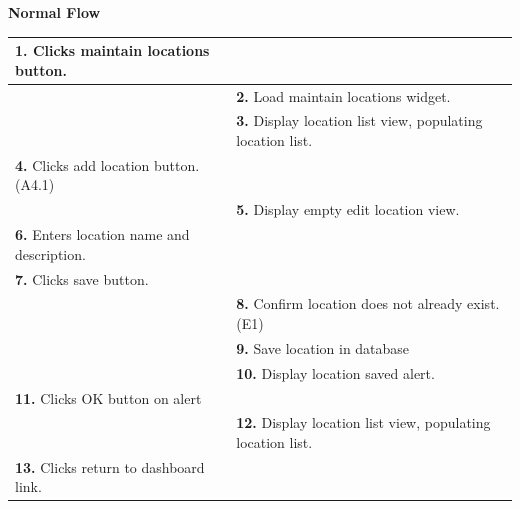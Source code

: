 \documentclass[letterpaper,12pt]{report}
\begin{document}
{ \centering \textbf{Normal Flow}
\begin{center}
\xuchead
\begin{tabular}{| p{8.5cm} | p{8.5cm} |}
\hline
\textbf{1.} Clicks maintain locations button. & \\
\hline
& \textbf{2.} Load maintain locations widget. \\
\hline
& \textbf{3.} Display location list view, populating location list. \\
\hline
\textbf{4.} Clicks add location button. (A4.1) & \\
\hline
& \textbf{5.} Display empty edit location view. \\
\hline
\textbf{6.} Enters location name and description. & \\
\hline
\textbf{7.} Clicks save button. & \\
\hline
& \textbf{8.} Confirm location does not already exist. (E1) \\
\hline
& \textbf{9.} Save location in database \\
\hline
& \textbf{10.} Display location saved alert. \\
\hline
\textbf{11.} Clicks OK button on alert & \\
\hline
& \textbf{12.} Display location list view, populating location list. \\
\hline
\textbf{13.} Clicks return to dashboard link. & \\
\hline



\end{tabular}
\end{center}}
\end{document}
